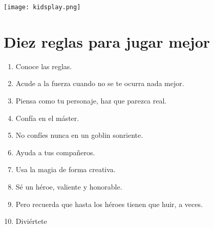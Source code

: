 \begin{multicols}{2}
\vspace{10pt}
\texttt{[image: kidsplay.png]}


\section{Diez reglas para jugar mejor}
\begin{enumerate}
\item Conoce las reglas.
\item Acude a la fuerza cuando no se te ocurra nada mejor.
\item Piensa como tu personaje, haz que parezca real.
\item Confía en el máster.
\item No confíes nunca en un goblin sonriente.
\item Ayuda a tus compañeros.
\item Usa la magia de forma creativa.
\item Sé un héroe, valiente y honorable.
\item Pero recuerda que hasta los héroes tienen que huir, a veces.
\item Diviértete
\end{enumerate}

\end{multicols}


